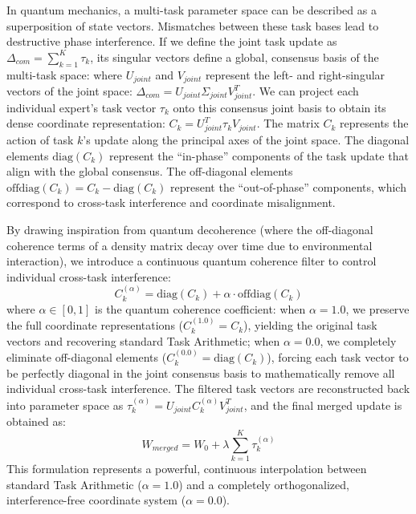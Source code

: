 \documentclass{article}
\theoremstyle{plain}
\theoremstyle{definition}
\theoremstyle{remark}
\begin{document}
In quantum mechanics, a multi-task parameter space can be described as a superposition of state vectors. Mismatches between these task bases lead to destructive phase interference. If we define the joint task update as $\Delta_{com} = \sum_{k=1}^K \tau_k$, its singular vectors define a global, consensus basis of the multi-task space:
where $U_{joint}$ and $V_{joint}$ represent the left- and right-singular vectors of the joint space: $\Delta_{com} = U_{joint} \Sigma_{joint} V_{joint}^T$. We can project each individual expert's task vector $\tau_k$ onto this consensus joint basis to obtain its dense coordinate representation: $C_k = U_{joint}^T \tau_k V_{joint}$.
The matrix $C_k$ represents the action of task $k$'s update along the principal axes of the joint space. The diagonal elements $\text{diag}(C_k)$ represent the ``in-phase'' components of the task update that align with the global consensus. The off-diagonal elements $\text{offdiag}(C_k) = C_k - \text{diag}(C_k)$ represent the ``out-of-phase'' components, which correspond to cross-task interference and coordinate misalignment.

By drawing inspiration from quantum decoherence (where the off-diagonal coherence terms of a density matrix decay over time due to environmental interaction), we introduce a continuous quantum coherence filter to control individual cross-task interference:
\begin{equation}
    C_k^{(\alpha)} = \text{diag}(C_k) + \alpha \cdot \text{offdiag}(C_k)
\end{equation}
where $\alpha \in [0, 1]$ is the quantum coherence coefficient: when $\alpha = 1.0$, we preserve the full coordinate representations ($C_k^{(1.0)} = C_k$), yielding the original task vectors and recovering standard Task Arithmetic; when $\alpha = 0.0$, we completely eliminate off-diagonal elements ($C_k^{(0.0)} = \text{diag}(C_k)$), forcing each task vector to be perfectly diagonal in the joint consensus basis to mathematically remove all individual cross-task interference. The filtered task vectors are reconstructed back into parameter space as $\tau_k^{(\alpha)} = U_{joint} C_k^{(\alpha)} V_{joint}^T$, and the final merged update is obtained as:
\begin{equation}
    W_{merged} = W_0 + \lambda \sum_{k=1}^K \tau_k^{(\alpha)}
\end{equation}
This formulation represents a powerful, continuous interpolation between standard Task Arithmetic ($\alpha = 1.0$) and a completely orthogonalized, interference-free coordinate system ($\alpha = 0.0$).
\end{document}
